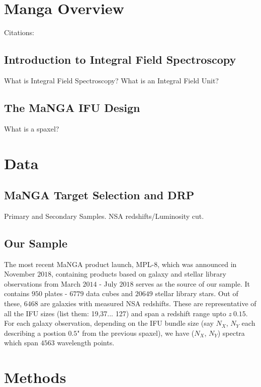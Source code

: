 \section{Manga Overview}
Citations: \citep{bundy_overview_2014}

\subsection{Introduction to Integral Field Spectroscopy}
What is Integral Field Spectroscopy? What is an Integral Field Unit? 

\subsection{The MaNGA IFU Design}
What is a spaxel? \citep{drory_manga_2015}

\section{Data}
\subsection{MaNGA Target Selection and DRP}
Primary and Secondary Samples. NSA redshifts/Luminosity cut.

\subsection{Our Sample}
The most recent MaNGA product launch, MPL-$8$, which was announced in November $2018$, containing products based on galaxy and stellar library observations from March $2014$ - July $2018$ serves as the source of our sample. It contains $950$ plates - $6779$ data cubes and $20649$ stellar library stars. Out of these, $6468$ are galaxies with measured NSA redshifts. These are representative of all the IFU sizes (list them: 19,37... 127) and span a redshift range upto $z ~ 0.15$.\\
For each galaxy observation, depending on the IFU bundle size (say $N_{X}$, $N_{Y}$ each describing a postion $0.5$" from the previous spaxel), we have ($N_{X}$, $N_{Y}$) spectra which span $4563$ wavelength points. 

\section{Methods}

